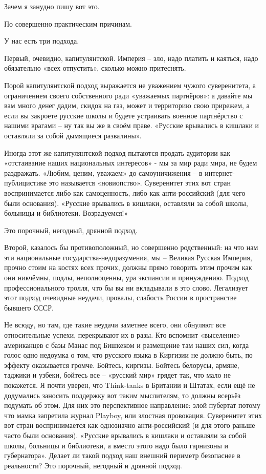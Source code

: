Зачем я занудно пишу вот это.

По совершенно практическим причинам. 

У нас есть три подхода.

Первый, очевидно, капитулянтской. Империя – зло, надо платить и каяться, надо
обязательно «всех отпустить», сколько можно притеснять. 

Порой капитулянтской подход выражается не уважением чужого суверенитета, а
ограничением своего собственного ради «уважаемых партнёров»: а давайте мы вам
много денег дадим, скидок на газ, может и территорию свою прирежем, а если вы
закроете русские школы и будете устраивать военное партнёрство с нашими врагами
– ну так вы же в своём праве. «Русские врывались в кишлаки и оставляли за собой
дымящиеся развалины».


Иногда этот же капитулянтской подход пытаются продать аудитории как
«отстаивание наших национальных интересов» - мы за мир ради мира, не будем
раздражать. «Любим, ценим, уважаем» до самоуничижения – в интернет-публицистике
это называется «новиопство». Суверенитет этих вот стран воспринимается либо как
самоценность, либо как анти-российский (для чего были основания). «Русские
врывались в кишлаки, оставляли за собой школы, больницы и библиотеки.
Возрадуемся!»

Это порочный, негодный, дрянной подход.

Второй, казалось бы противоположный, но совершенно родственный: на что нам эти
национальные государства-недоразумения, мы – Великая Русская Империя, прочно
стоим на костях всех прочих, должны прямо говорить этим прочим как они
никчёмны, подлы, неполноценны, ура экспансии и принуждению. Подход
профессионального тролля, что бы вы ни вкладывали в это слово. Легализует этот
подход очевидные неудачи, провалы, слабость России в пространстве бывшего СССР.

Не всюду, но там, где такие неудачи заметнее всего, они обнуляют все
относительные успехи, перекрывают их в разы. Кто вспомнит «выселение»
американцев с базы Манас под Бишкеком и размещение там наших сил, когда голос
одно недоумка о том, что русского языка в Киргизии не должно быть, по эффекту
оказывается громче. Бойтесь, киргизы. Бойтесь белорусы, армяне, таджики и
узбеки, бойтесь все – «русский мир» грядет так, что мало не покажется. Я почти
уверен, что Think-tanks в Британии и Штатах, если ещё не додумались заносить
поддержку вот таким мыслителям, то должны всерьёз подумать об этом. Для них это
перспективное направление: злой пубертат потому что мамка запретила журнал
Playboy, или злостная провокация. Суверенитет этих вот стран воспринимается как
однозначно анти-российский (и для этого раньше часто были основания). «Русские
врывались в кишлаки и оставляли за собой школы, больницы и библиотеки, а вместо
этого надо было гарнизоны и губернатора». Делает ли такой подход наш внешний
периметр безопаснее в реальности?  Это порочный, негодный и дрянной подход.

